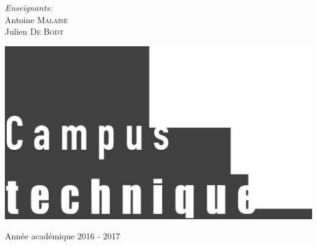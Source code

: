 \begin{center}
  \vspace{1.5cm}

  \begin{minipage}[t]{0.4 \textwidth}
    \begin{center} 
      \large \emph{Enseignants:} \\ 
      Antoine \textsc{Malaise} \\
      Julien \textsc{De Bodt}
    \end{center} 
  \end{minipage}

  \vspace{1cm}

  \includegraphics[scale=0.08]{textures/logo/technical_bw.eps}

  \vspace{0.5cm}

  Année académique 2016 - 2017
\end{center}

\thispagestyle{empty}
